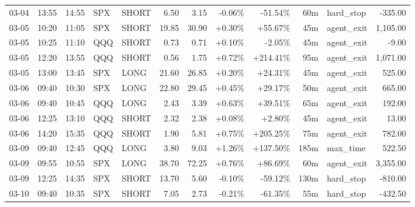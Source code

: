 \documentclass[11pt,a4paper,twoside]{article}
\begin{document}
\begin{center}
\begin{longtable}{>{\color{txtmain}}l l l l l r r r r r >{\color{txtmain}}l r}
03-04 & 13:55 & 14:55 & SPX & SHORT & 6.50 & 3.15 & \textcolor{lossred}{-0.06\%} & \textcolor{lossred}{-51.54\%} & 60m & hard\_stop & \textcolor{lossred}{-335.00} \\
03-05 & 10:20 & 11:05 & SPX & SHORT & 19.85 & 30.90 & \textcolor{wingreen}{+0.30\%} & \textcolor{wingreen}{+55.67\%} & 45m & agent\_exit & \textcolor{wingreen}{1,105.00} \\
03-05 & 10:25 & 11:10 & QQQ & SHORT & 0.73 & 0.71 & \textcolor{wingreen}{+0.10\%} & \textcolor{lossred}{-2.05\%} & 45m & agent\_exit & \textcolor{lossred}{-9.00} \\
03-05 & 12:20 & 13:55 & QQQ & SHORT & 0.56 & 1.75 & \textcolor{wingreen}{+0.72\%} & \textcolor{wingreen}{+214.41\%} & 95m & agent\_exit & \textcolor{wingreen}{1,071.00} \\
03-05 & 13:00 & 13:45 & SPX & LONG & 21.60 & 26.85 & \textcolor{wingreen}{+0.20\%} & \textcolor{wingreen}{+24.31\%} & 45m & agent\_exit & \textcolor{wingreen}{525.00} \\
03-06 & 09:40 & 10:30 & SPX & LONG & 22.80 & 29.45 & \textcolor{wingreen}{+0.45\%} & \textcolor{wingreen}{+29.17\%} & 50m & agent\_exit & \textcolor{wingreen}{665.00} \\
03-06 & 09:40 & 10:45 & QQQ & LONG & 2.43 & 3.39 & \textcolor{wingreen}{+0.63\%} & \textcolor{wingreen}{+39.51\%} & 65m & agent\_exit & \textcolor{wingreen}{192.00} \\
03-06 & 12:25 & 13:10 & QQQ & SHORT & 2.32 & 2.38 & \textcolor{wingreen}{+0.08\%} & \textcolor{wingreen}{+2.80\%} & 45m & agent\_exit & \textcolor{wingreen}{13.00} \\
03-06 & 14:20 & 15:35 & QQQ & SHORT & 1.90 & 5.81 & \textcolor{wingreen}{+0.75\%} & \textcolor{wingreen}{+205.25\%} & 75m & agent\_exit & \textcolor{wingreen}{782.00} \\
03-09 & 09:40 & 12:45 & QQQ & LONG & 3.80 & 9.03 & \textcolor{wingreen}{+1.26\%} & \textcolor{wingreen}{+137.50\%} & 185m & max\_time & \textcolor{wingreen}{522.50} \\
03-09 & 09:55 & 10:55 & SPX & LONG & 38.70 & 72.25 & \textcolor{wingreen}{+0.76\%} & \textcolor{wingreen}{+86.69\%} & 60m & agent\_exit & \textcolor{wingreen}{3,355.00} \\
03-09 & 12:25 & 14:35 & SPX & SHORT & 13.70 & 5.60 & \textcolor{lossred}{-0.10\%} & \textcolor{lossred}{-59.12\%} & 130m & hard\_stop & \textcolor{lossred}{-810.00} \\
03-10 & 09:40 & 10:35 & SPX & SHORT & 7.05 & 2.73 & \textcolor{lossred}{-0.21\%} & \textcolor{lossred}{-61.35\%} & 55m & hard\_stop & \textcolor{lossred}{-432.50} \\

\end{longtable}
\end{center}
\end{document}
